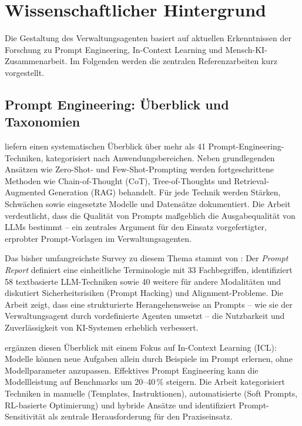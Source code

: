 \documentclass[12pt, a4paper]{article}
\begin{document}
\section{Wissenschaftlicher Hintergrund}

Die Gestaltung des Verwaltungsagenten basiert auf aktuellen Erkenntnissen der Forschung zu Prompt Engineering, In-Context Learning und Mensch-KI-Zusammenarbeit. Im Folgenden werden die zentralen Referenzarbeiten kurz vorgestellt.

\subsection{Prompt Engineering: Überblick und Taxonomien}

\textcite{sahoo2024survey} liefern einen systematischen Überblick über mehr als 41 Prompt-Engineering-Techniken, kategorisiert nach Anwendungsbereichen. Neben grundlegenden Ansätzen wie Zero-Shot- und Few-Shot-Prompting werden fortgeschrittene Methoden wie Chain-of-Thought (CoT), Tree-of-Thoughts und Retrieval-Augmented Generation (RAG) behandelt. Für jede Technik werden Stärken, Schwächen sowie eingesetzte Modelle und Datensätze dokumentiert. Die Arbeit verdeutlicht, dass die Qualität von Prompts maßgeblich die Ausgabequalität von LLMs bestimmt -- ein zentrales Argument für den Einsatz vorgefertigter, erprobter Prompt-Vorlagen im Verwaltungsagenten.

Das bisher umfangreichste Survey zu diesem Thema stammt von \textcite{schulhoff2025promptreport}: Der \textit{Prompt Report} definiert eine einheitliche Terminologie mit 33 Fachbegriffen, identifiziert 58 textbasierte LLM-Techniken sowie 40 weitere für andere Modalitäten und diskutiert Sicherheitsrisiken (Prompt Hacking) und Alignment-Probleme. Die Arbeit zeigt, dass eine strukturierte Herangehensweise an Prompts -- wie sie der Verwaltungsagent durch vordefinierte Agenten umsetzt -- die Nutzbarkeit und Zuverlässigkeit von KI-Systemen erheblich verbessert.

\textcite{hooper2025incontext} ergänzen diesen Überblick mit einem Fokus auf In-Context Learning (ICL): Modelle können neue Aufgaben allein durch Beispiele im Prompt erlernen, ohne Modellparameter anzupassen. Effektives Prompt Engineering kann die Modellleistung auf Benchmarks um 20--40\,\% steigern. Die Arbeit kategorisiert Techniken in manuelle (Templates, Instruktionen), automatisierte (Soft Prompts, RL-basierte Optimierung) und hybride Ansätze und identifiziert Prompt-Sensitivität als zentrale Herausforderung für den Praxiseinsatz.
\end{document}
